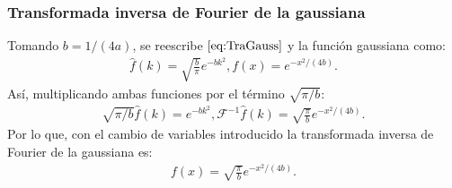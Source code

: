 \documentclass[12pt]{article}
\theoremstyle{definition}
\begin{document}
\subsubsection{Transformada inversa de Fourier de la gaussiana}
\noindent
Tomando $b = 1/(4a)$, se reescribe $\eqref{eq:TraGauss}$ y la función gaussiana como:
\begin{align*}
     \hat{f}(k) =
     \sqrt{\frac{b}{\pi}}e^{-bk^2}, f(x) = e^{-x^2/(4b)}.
\end{align*}
Así, multiplicando ambas funciones por el término $\sqrt{\pi/b}$:
\begin{align*}
    \sqrt{\pi/b}\hat{f}(k) = e^{-bk^2}, \mathcal{F}^{-1}\hat{f}(k) = \sqrt{\frac{\pi}{b}} e^{-x^2/(4b)}.
\end{align*}
Por lo que, con el cambio de variables introducido la transformada inversa de Fourier de la gaussiana es:
\begin{align}
   f(x)= \sqrt{\frac{\pi}{b}} e^{-x^2/(4b)}. 
   \label{eq:InvGauss}
\end{align}
\end{document}
